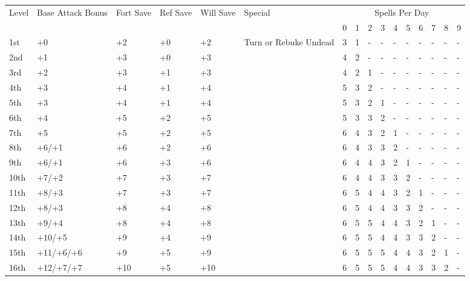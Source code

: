 \begin{table}[htb]
\begin{small}
\begin{tabular}{lp{2cm}p{0.7cm}p{0.7cm}p{0.7cm}l llllllllll}
Level  &Base Attack Bonus &Fort Save &Ref Save &Will Save &Special & \multicolumn{10}{c}{Spells Per Day}\\
       &                &    &    &    &                        &0 &1 &2 &3 &4 &5 &6 &7 &8 &9 \\
1st    &+0              &+2  &+0  &+2  & Turn or Rebuke Undead  &3 &1 &- &- &- &- &- &- &- &- \\
2nd    &+1              &+3  &+0  &+3  &                        &4 &2 &- &- &- &- &- &- &- &- \\
3rd    &+2              &+3  &+1  &+3  &                        &4 &2 &1 &- &- &- &- &- &- &- \\
4th    &+3              &+4  &+1  &+4  &                        &5 &3 &2 &- &- &- &- &- &- &- \\
5th    &+3              &+4  &+1  &+4  &                        &5 &3 &2 &1 &- &- &- &- &- &- \\
6th    &+4              &+5  &+2  &+5  &                        &5 &3 &3 &2 &- &- &- &- &- &- \\
7th    &+5              &+5  &+2  &+5  &                        &6 &4 &3 &2 &1 &- &- &- &- &- \\
8th    &+6/+1           &+6  &+2  &+6  &                        &6 &4 &3 &3 &2 &- &- &- &- &- \\
9th    &+6/+1           &+6  &+3  &+6  &                        &6 &4 &4 &3 &2 &1 &- &- &- &- \\
10th   &+7/+2           &+7  &+3  &+7  &                        &6 &4 &4 &3 &3 &2 &- &- &- &- \\
11th   &+8/+3           &+7  &+3  &+7  &                        &6 &5 &4 &4 &3 &2 &1 &- &- &- \\
12th   &+8/+3           &+8  &+4  &+8  &                        &6 &5 &4 &4 &3 &3 &2 &- &- &- \\
13th   &+9/+4           &+8  &+4  &+8  &                        &6 &5 &5 &4 &4 &3 &2 &1 &- &- \\
14th   &+10/+5          &+9  &+4  &+9  &                        &6 &5 &5 &4 &4 &3 &3 &2 &- &- \\
15th   &+11/+6/+6       &+9  &+5  &+9  &                        &6 &5 &5 &5 &4 &4 &3 &2 &1 &- \\
16th   &+12/+7/+7       &+10 &+5  &+10 &                        &6 &5 &5 &5 &4 &4 &3 &3 &2 &- \\

\end{tabular}
\end{small}
\end{table}
